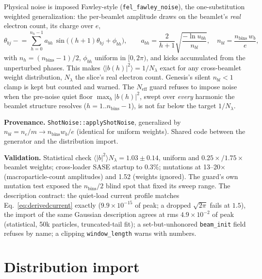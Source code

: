 \documentclass[11pt]{article}
\newcommand{\code}[1]{\texttt{#1}}
\newenvironment{provenance}{\par\small\textbf{Provenance.}}{\par}
\newenvironment{validation}{\par\small\textbf{Validation.}}{\par}
\begin{document}
Physical noise is imposed Fawley-style (\code{fel\_fawley\_noise}), the one-substitution
weighted generalization: the per-beamlet amplitude draws on the beamlet's \emph{real}
electron count, its charge over $e$,
\begin{equation}\label{eq:fawley}
  \theta_{bj} \mathrel{-}= \sum_{h=0}^{n_h-1} a_{bh}\,
     \sin\!\bigl((h{+}1)\theta_{bj} + \phi_{bh}\bigr),
  \qquad
  a_{bh} = \frac{2}{h+1}\sqrt{\frac{-\ln u_{bh}}{n_{bl}}},
  \quad n_{bl} = \frac{n_{\mathrm{bins}}\, w_b}{e},
\end{equation}
with $n_h = (n_{\mathrm{bins}}-1)/2$, $\phi_{bh}$ uniform in $[0,2\pi)$, and kicks
accumulated from the unperturbed phases. This makes $\langle|b(h)|^2\rangle =
1/N_\lambda$ exact for any cross-beamlet weight distribution, $N_\lambda$ the slice's
real electron count. Genesis's silent $n_{bl}<1$ clamp is kept but counted and warned.
The $N_{\mathrm{eff}}$ guard refuses to impose noise when the pre-noise quiet floor
$\max_h |b(h)|^2$, swept over \emph{every} harmonic the beamlet structure resolves
($h = 1..n_{\mathrm{bins}}-1$), is not far below the target $1/N_\lambda$.

\begin{provenance}
\code{ShotNoise::applyShotNoise}, generalized by $n_{bl} = n_e/m \to n_{\mathrm{bins}}
w_b/e$ (identical for uniform weights). Shared code between the generator and the
distribution import.
\end{provenance}
\begin{validation}
Statistical check $\langle|b|^2\rangle N_\lambda = 1.03\pm0.14$, uniform and
$0.25\times/1.75\times$ beamlet weights; cross-loader SASE startup to 0.3\%;
mutations at 13--20$\times$ (macroparticle-count amplitudes) and 1.52
(weights ignored). The guard's own mutation test exposed the $n_{\mathrm{bins}}/2$
blind spot that fixed its sweep range. The description contract: the quiet-load
current profile matches Eq.~\ref{eq:derivedcurrent} exactly ($9.9\times10^{-15}$ of
peak; a dropped $\sqrt{2\pi}$ fails at $1.5$), the import of the same Gaussian
description agrees at rms $4.9\times10^{-2}$ of peak (statistical, 50k particles,
truncated-tail fit); a set-but-unhonored \code{beam\_init} field refuses by name; a
clipping \code{window\_length} warns with numbers.
\end{validation}

\section{Distribution import}\label{sec:import}
\end{document}

